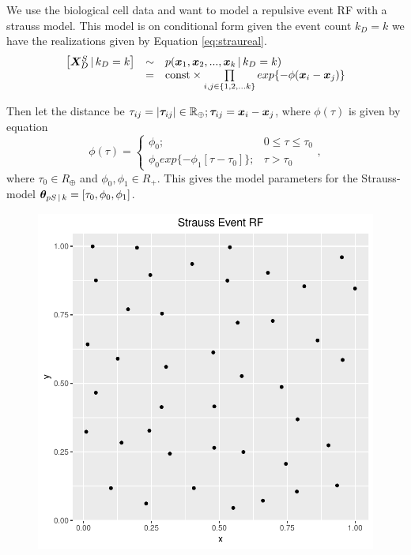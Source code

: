 \section{}
\label{sec:problem4}

We use the biological cell data and want to model a repulsive event RF with a strauss model. This model is on conditional form given the event count $k_D = k$ we have the realizations given by Equation \ref{eq:straureal}. 
\begin{equation}
    \begin{array}{rcl}
        \left[\bm{X}_D^S \, | \, k_D = k\right] & \sim & p(\bm{x}_1,\bm{x}_2,...,\bm{x}_k \, | \, k_D = k) \\
         & = & \mathrm{const} \times \prod\limits_{i,j\in \{1,2,...k\}} exp\{-\phi(\bm{x}_i-\bm{x}_j)\}
    \end{array}
    \label{eq:straureal}
\end{equation}

Then let the distance be $\tau_{ij} = |\bm{\tau}_{ij}| \in \mathbb{R}_\oplus; \bm{\tau}_{ij} = \bm{x}_i - \bm{x}_j$, where $\phi(\tau)$ is given by equation 
\begin{equation}
    \phi(\tau) = \begin{cases}
                    \phi_0; & 0 \leq \tau \leq \tau_0\\
                    \phi_0 exp\{-\phi_1[\tau-\tau_0]\}; & \tau > \tau_0
                \end{cases},
    \label{eq:interfunction}
\end{equation}
where $\tau_0 \in R_\oplus$ and $\phi_0,\phi_1 \in R_+$. This gives the model parameters for the Strauss-model $\bm{\theta} _{pS\, | \, k} = [\tau_0,\phi_0,\phi_1]$.

\begin{figure}
    \centering
    \includegraphics[scale=0.95]{figures/repulsive_event_rf.pdf}
    \caption{}
    \label{fig:repulsive_event_rf}
\end{figure}

